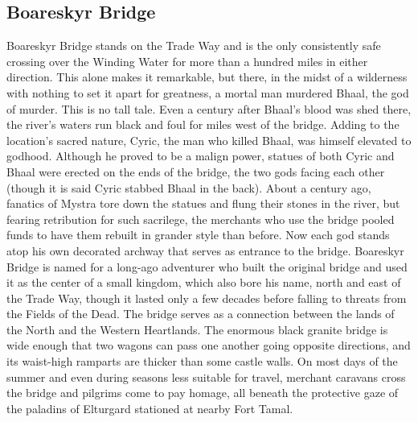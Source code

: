 \documentclass[10pt,a4paper,twoside,twocolumn,openany,bg=print,nodeprecatedcode]{dndbook}
\begin{document}
\subsection{Boareskyr Bridge}
Boareskyr Bridge stands on the Trade Way and is the only consistently safe crossing over the Winding Water for more than a hundred miles in either direction. This alone makes it remarkable, but there, in the midst of a wilderness with nothing to set it apart for greatness, a mortal man murdered Bhaal, the god of murder. This is no tall tale. Even a century after Bhaal's blood was shed there, the river's waters run black and foul for miles west of the bridge.
Adding to the location's sacred nature, Cyric, the man who killed Bhaal, was himself elevated to godhood. Although he proved to be a malign power, statues of both Cyric and Bhaal were erected on the ends of the bridge, the two gods facing each other (though it is said Cyric stabbed Bhaal in the back). About a century ago, fanatics of Mystra tore down the statues and flung their stones in the river, but fearing retribution for such sacrilege, the merchants who use the bridge pooled funds to have them rebuilt in grander style than before. Now each god stands atop his own decorated archway that serves as entrance to the bridge.
Boareskyr Bridge is named for a long-ago adventurer who built the original bridge and used it as the center of a small kingdom, which also bore his name, north and east of the Trade Way, though it lasted only a few decades before falling to threats from the Fields of the Dead. The bridge serves as a connection between the lands of the North and the Western Heartlands.
The enormous black granite bridge is wide enough that two wagons can pass one another going opposite directions, and its waist-high ramparts are thicker than some castle walls. On most days of the summer and even during seasons less suitable for travel, merchant caravans cross the bridge and pilgrims come to pay homage, all beneath the protective gaze of the paladins of Elturgard stationed at nearby Fort Tamal.
\end{document}
